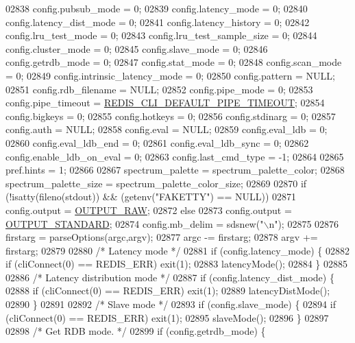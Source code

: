 \begin{DoxyCode}
{{{{{{{{{{{{{{{{{{{{{{{{{{{{{{{{{{{{{{{{{{{{{{{{{{{{{{{{{{{{{{{{{{{{{{{{{{{{{{{{{{{{{{{{{{{{{{{{{{{{{{{{{{{{{{{{{{{{02838     config.pubsub\_mode = 0;
02839     config.latency\_mode = 0;
02840     config.latency\_dist\_mode = 0;
02841     config.latency\_history = 0;
02842     config.lru\_test\_mode = 0;
02843     config.lru\_test\_sample\_size = 0;
02844     config.cluster\_mode = 0;
02845     config.slave\_mode = 0;
02846     config.getrdb\_mode = 0;
02847     config.stat\_mode = 0;
02848     config.scan\_mode = 0;
02849     config.intrinsic\_latency\_mode = 0;
02850     config.pattern = NULL;
02851     config.rdb\_filename = NULL;
02852     config.pipe\_mode = 0;
02853     config.pipe\_timeout = \hyperlink{redis-cli_8c_aa509dd2ea6ba533a33b1537622c215da}{REDIS\_CLI\_DEFAULT\_PIPE\_TIMEOUT};
02854     config.bigkeys = 0;
02855     config.hotkeys = 0;
02856     config.stdinarg = 0;
02857     config.auth = NULL;
02858     config.eval = NULL;
02859     config.eval\_ldb = 0;
02860     config.eval\_ldb\_end = 0;
02861     config.eval\_ldb\_sync = 0;
02862     config.enable\_ldb\_on\_eval = 0;
02863     config.last\_cmd\_type = -1;
02864 
02865     pref.hints = 1;
02866 
02867     spectrum\_palette = spectrum\_palette\_color;
02868     spectrum\_palette\_size = spectrum\_palette\_color\_size;
02869 
02870     \textcolor{keywordflow}{if} (!isatty(fileno(stdout)) && (getenv(\textcolor{stringliteral}{"FAKETTY"}) == NULL))
02871         config.output = \hyperlink{redis-cli_8c_a4f47017b54da140967dcbd440fae227c}{OUTPUT\_RAW};
02872     \textcolor{keywordflow}{else}
02873         config.output = \hyperlink{redis-cli_8c_abf624f04f4590979c3c3944bc7f94d6e}{OUTPUT\_STANDARD};
02874     config.mb\_delim = sdsnew(\textcolor{stringliteral}{"\(\backslash\)n"});
02875 
02876     firstarg = parseOptions(argc,argv);
02877     argc -= firstarg;
02878     argv += firstarg;
02879 
02880     \textcolor{comment}{/* Latency mode */}
02881     \textcolor{keywordflow}{if} (config.latency\_mode) \{
02882         \textcolor{keywordflow}{if} (cliConnect(0) == REDIS\_ERR) exit(1);
02883         latencyMode();
02884     \}
02885 
02886     \textcolor{comment}{/* Latency distribution mode */}
02887     \textcolor{keywordflow}{if} (config.latency\_dist\_mode) \{
02888         \textcolor{keywordflow}{if} (cliConnect(0) == REDIS\_ERR) exit(1);
02889         latencyDistMode();
02890     \}
02891 
02892     \textcolor{comment}{/* Slave mode */}
02893     \textcolor{keywordflow}{if} (config.slave\_mode) \{
02894         \textcolor{keywordflow}{if} (cliConnect(0) == REDIS\_ERR) exit(1);
02895         slaveMode();
02896     \}
02897 
02898     \textcolor{comment}{/* Get RDB mode. */}
02899     \textcolor{keywordflow}{if} (config.getrdb\_mode) \{
}}}}}}}}}}}}}}}}}}}}}}}}}}}}}}}}}}}}}}}}}}}}}}}}}}}}}}}}}}}}}}}}}}}}}}}}}}}}}}}}}}}}}}}}}}}}}}}}}}}}}}}}}}}}}}}}}}}}
\end{DoxyCode}
